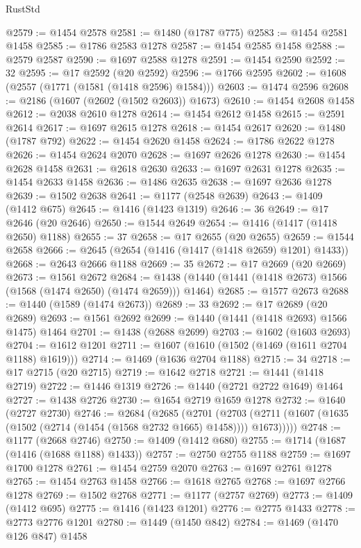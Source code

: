 \begin{lexlean}{RustStd}
\begin{coremodule}
{\begin{coremodule}
{{{{{{{{{{{{{{{{{{{{{{{{{{{{{{{@2579 := @1454 @2578
@2581 := @1480 (@1787 @775)
@2583 := @1454 @2581 @1458
@2585 := @1786 @2583 @1278
@2587 := @1454 @2585 @1458
@2588 := @2579 @2587
@2590 := @1697 @2588 @1278
@2591 := @1454 @2590
@2592 := 32
@2595 := @17 @2592 (@20 @2592)
@2596 := @1766 @2595
@2602 := @1608 (@2557 (@1771 (@1581 (@1418 @2596) @1584)))
@2603 := @1474 @2596
@2608 := @2186 (@1607 (@2602 (@1502 @2603)) @1673)
@2610 := @1454 @2608 @1458
@2612 := @2038 @2610 @1278
@2614 := @1454 @2612 @1458
@2615 := @2591 @2614
@2617 := @1697 @2615 @1278
@2618 := @1454 @2617
@2620 := @1480 (@1787 @792)
@2622 := @1454 @2620 @1458
@2624 := @1786 @2622 @1278
@2626 := @1454 @2624 @2070
@2628 := @1697 @2626 @1278
@2630 := @1454 @2628 @1458
@2631 := @2618 @2630
@2633 := @1697 @2631 @1278
@2635 := @1454 @2633 @1458
@2636 := @1486 @2635
@2638 := @1697 @2636 @1278
@2639 := @1502 @2638
@2641 := @1177 (@2548 @2639)
@2643 := @1409 (@1412 @675)
@2645 := @1416 (@1423 @1319)
@2646 := 36
@2649 := @17 @2646 (@20 @2646)
@2650 := @1544 @2649
@2654 := @1416 (@1417 (@1418 @2650) @1188)
@2655 := 37
@2658 := @17 @2655 (@20 @2655)
@2659 := @1544 @2658
@2666 := @2645 (@2654 (@1416 (@1417 (@1418 @2659) @1201) @1433))
@2668 := @2643 @2666 @1188
@2669 := 35
@2672 := @17 @2669 (@20 @2669)
@2673 := @1561 @2672
@2684 := @1438 (@1440 (@1441 (@1418 @2673) @1566 (@1568 (@1474 @2650) (@1474 @2659))) @1464)
@2685 := @1577 @2673
@2688 := @1440 (@1589 (@1474 @2673))
@2689 := 33
@2692 := @17 @2689 (@20 @2689)
@2693 := @1561 @2692
@2699 := @1440 (@1441 (@1418 @2693) @1566 @1475) @1464
@2701 := @1438 (@2688 @2699)
@2703 := @1602 (@1603 @2693)
@2704 := @1612 @1201
@2711 := @1607 (@1610 (@1502 (@1469 (@1611 @2704 @1188) @1619)))
@2714 := @1469 (@1636 @2704 @1188)
@2715 := 34
@2718 := @17 @2715 (@20 @2715)
@2719 := @1642 @2718
@2721 := @1441 (@1418 @2719)
@2722 := @1446 @1319
@2726 := @1440 (@2721 @2722 @1649) @1464
@2727 := @1438 @2726
@2730 := @1654 @2719 @1659 @1278
@2732 := @1640 (@2727 @2730)
@2746 := @2684
    (@2685
      (@2701
        (@2703 (@2711 (@1607 (@1635 (@1502 (@2714 (@1454 (@1568 @2732 @1665) @1458)))) @1673)))))
@2748 := @1177 (@2668 @2746)
@2750 := @1409 (@1412 @680)
@2755 := @1714 (@1687 (@1416 (@1688 @1188) @1433))
@2757 := @2750 @2755 @1188
@2759 := @1697 @1700 @1278
@2761 := @1454 @2759 @2070
@2763 := @1697 @2761 @1278
@2765 := @1454 @2763 @1458
@2766 := @1618 @2765
@2768 := @1697 @2766 @1278
@2769 := @1502 @2768
@2771 := @1177 (@2757 @2769)
@2773 := @1409 (@1412 @695)
@2775 := @1416 (@1423 @1201)
@2776 := @2775 @1433
@2778 := @2773 @2776 @1201
@2780 := @1449 (@1450 @842)
@2784 := @1469 (@1470 @126 @847) @1458
}}}}}}}}}}}}}}}}}}}}}}}}}}}}}}}
\end{coremodule}}
\end{coremodule}
\end{lexlean}
